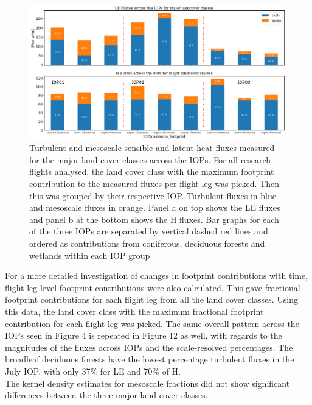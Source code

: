 \documentclass[draft]{agujournal2019}
\begin{document}
 \begin{figure}[hbtp]
 \noindent\includegraphics[width=\textwidth]{footprint_IOP.png}
\caption{ Turbulent and mesoscale sensible and latent heat fluxes measured for the major land cover classes across the IOPs. For all research flights analysed, the land cover class with the maximum footprint contribution to the measured fluxes per flight leg was picked. Then this was grouped by their respective IOP. Turbulent fluxes in blue and mesoscale fluxes in orange. Panel a on top shows the LE fluxes and panel b at the bottom shows the H fluxes. Bar graphs for each of the three IOPs are separated by vertical dashed red lines and ordered as  contributions from coniferous, deciduous forests and wetlands within each IOP group }
\label{fig:footprint_IOP}
 \end{figure}
 
For a more detailed investigation of changes in footprint contributions with time, flight leg level footprint contributions were also calculated. This gave fractional footprint contributions for each flight leg from all the land cover classes. Using this data, the land cover class with the maximum fractional footprint contribution for each flight leg was picked. The same overall pattern across the IOPs seen in Figure 4 is repeated in Figure 12 as well, with regards to the magnitudes of the fluxes across IOPs and the scale-resolved percentages. The broadleaf deciduous forests have the lowest percentage turbulent fluxes in the July IOP, with only 37\% for LE and 70\% of H. \\
The kernel density estimates for mesoscale fractions did not show significant differences between the three major land cover classes.
\end{document}
